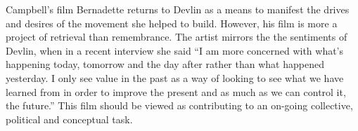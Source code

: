 \documentclass[12pt]{article}
\begin{document}
Campbell's film Bernadette returns to Devlin as a means to manifest the drives and desires of the movement she helped to build. However, his film is more a project of retrieval than remembrance. The artist mirrors the the sentiments of Devlin, when in a recent interview she said ``I am more concerned with what's happening today, tomorrow and the day after rather than what happened yesterday. I only see value in the past as a way of looking to see what we have learned from in order to improve the present and as much as we can control it, the future.'' This film should be viewed as contributing to an on-going collective, political and conceptual task. 


\newpage
\nonfrenchspacing
{} 
\begin{spacing}{0.9}

\end{spacing}
\end{document}
